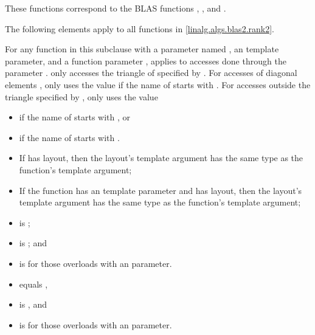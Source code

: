 \pnum
\begin{note}
These functions correspond to the BLAS functions
, ,  and \supercite{blas2}.
\end{note}

\pnum
The following elements apply to all functions in \ref{linalg.algs.blas2.rank2}.

\pnum
For any function  in this subclause with
a parameter named ,
an  template parameter, and
a function parameter ,
 applies to accesses done through the parameter .
 only accesses the triangle of  specified by .
For accesses of diagonal elements ,
 only uses the value 
if the name of  starts with .
For accesses  outside the triangle specified by ,
 only uses the value
\begin{itemize}
\item
{}
if the name of  starts with , or
\item
{}
if the name of  starts with .
\end{itemize}

\pnum
\mandates
\begin{itemize}
\item
If  has  layout,
then the layout's  template argument has
the same type as the function's  template argument;
\item
If the function has an  template parameter and
 has  layout,
then the layout's  template argument has
the same type as the function's  template argument;
\item
{}
is ;
\item
{}
is ; and
\item
{}
is  for those overloads with an  parameter.
\end{itemize}

\pnum
\expects
\begin{itemize}
\item
{} equals ,
\item
{} is , and
\item
{} is 
for those overloads with an  parameter.
\end{itemize}

